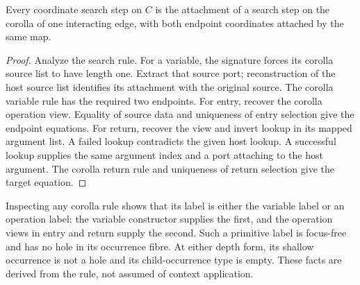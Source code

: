 \begin{theorem}
Every coordinate search step on $C$ is the attachment of a search step on the
corolla of one interacting edge, with both endpoint coordinates attached by
the same map.
\end{theorem}
\begin{proof}
Analyze the search rule. For a variable, the signature forces its corolla
source list to have length one. Extract that source port; reconstruction of
the host source list identifies its attachment with the original source.
The corolla variable rule has the required two endpoints.
For entry, recover the corolla operation view. Equality of source data and
uniqueness of entry selection give the endpoint equations. For return,
recover the view and invert lookup in its mapped argument list. A failed
lookup contradicts the given host lookup. A successful lookup supplies the
same argument index and a port attaching to the host argument. The corolla
return rule and uniqueness of return selection give the target equation.
\end{proof}
Inspecting any corolla rule shows that its label is either the variable label
or an operation label: the variable constructor supplies the first, and the
operation views in entry and return supply the second. Such a primitive label
is focus-free and has no hole in its occurrence fibre. At either depth form,
its shallow occurrence is not a hole and its child-occurrence type is empty.
These facts are derived from the rule, not assumed of context application.


